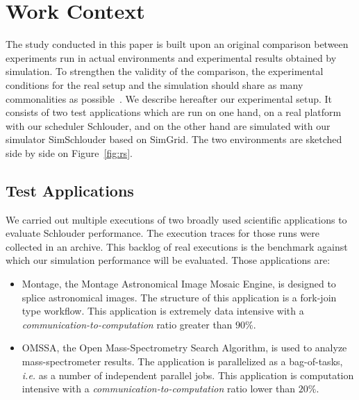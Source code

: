 \documentclass[10pt,conference,compsocconf]{IEEEtran}
\begin{document}
\section{Work Context}
\label{sec:work-context}

The  study conducted  in this  paper  is built upon an  original comparison  between %
experiments  run in  actual environments  and experimental  results obtained  by
simulation.   To strengthen  the validity  of the  comparison, the  experimental
conditions  for  the  real  setup  and  the  simulation  should  share  as  many
commonalities  as   possible~\cite{PucherGWK15}.   We  describe   hereafter  our
experimental setup.  It consists of two  test applications which are  run on one
hand, on a real platform with our scheduler Schlouder, and on the other hand are
simulated  with   our  simulator  SimSchlouder   based  on  SimGrid.    The  two
environments are sketched side by side on Figure~\ref{fig:rs}.

\subsection{Test Applications}\label{sc:setup}

We  carried out  multiple executions  of two broadly used scientific  applications
to  evaluate Schlouder  performance. The execution traces for  those runs were
collected  in an  archive.  This backlog  of real  executions  is the  benchmark
against which  our simulation  performance will  be evaluated.  Those applications
are:

\begin{itemize}
\item Montage\cite{montage2009},  the Montage Astronomical Image  Mosaic Engine,
  is designed to  splice astronomical images. The structure  of this application
  is a  fork-join type  workflow. This application  is extremely  data intensive
  with a \emph{communication-to-computation} ratio greater than $90\%$.

\item OMSSA\cite{Geer2004}, the Open Mass-Spectrometry Search Algorithm, is used
  to analyze  mass-spectrometer results.  The application  is parallelized  as a
  bag-of-tasks, \textit{i.e.}  as a  number of  independent parallel  jobs. This
  application        is        computation        intensive        with        a
  \emph{communication-to-computation} ratio lower than $20\%$.
\end{itemize}
\end{document}
